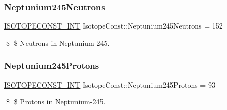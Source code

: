 \subsubsection{\texorpdfstring{Neptunium245\+Neutrons}{Neptunium245Neutrons}}
{\footnotesize\ttfamily \mbox{\hyperlink{group___isotope_const-_macros_ga5f18360b3e99483a35c32d789e62621c}{I\+S\+O\+T\+O\+P\+E\+C\+O\+N\+S\+T\+\_\+\+I\+NT}} Isotope\+Const\+::\+Neptunium245\+Neutrons = 152}

\$ \$ Neutrons in Neptunium-\/245. \mbox{\label{group___isotope_const-_neptunium-_np245_ga6cccb36bc42cba1a4788307b09d144d1}} 
\subsubsection{\texorpdfstring{Neptunium245\+Protons}{Neptunium245Protons}}
{\footnotesize\ttfamily \mbox{\hyperlink{group___isotope_const-_macros_ga5f18360b3e99483a35c32d789e62621c}{I\+S\+O\+T\+O\+P\+E\+C\+O\+N\+S\+T\+\_\+\+I\+NT}} Isotope\+Const\+::\+Neptunium245\+Protons = 93}

\$ \$ Protons in Neptunium-\/245. 